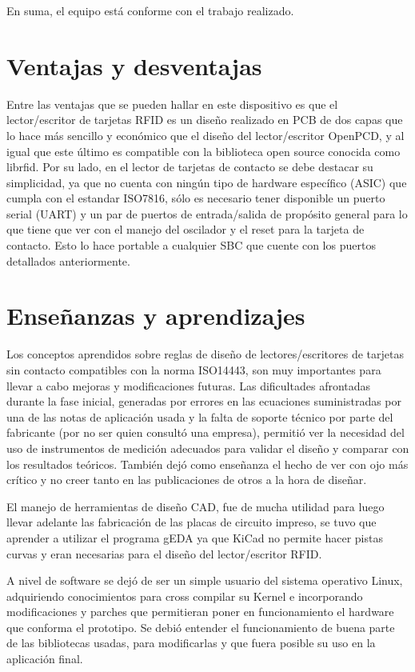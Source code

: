En suma, el equipo está conforme con el trabajo realizado.


\section{Ventajas y desventajas}


Entre las ventajas que se pueden hallar en este dispositivo es que el lector/escritor de tarjetas RFID es un diseño realizado en PCB de dos capas que lo hace más sencillo y económico que el diseño del lector/escritor OpenPCD, y al igual que este último es compatible con la biblioteca open source conocida como librfid.
Por su lado, en el lector de tarjetas de contacto se debe destacar su simplicidad, ya que no cuenta con ningún tipo de hardware específico (ASIC) que cumpla con el estandar ISO7816, sólo es necesario tener disponible un puerto serial (UART) y un par de puertos de entrada/salida de propósito general para lo que tiene que ver con el manejo del oscilador y el reset para la tarjeta de contacto. Esto lo hace portable a cualquier SBC que cuente con los puertos detallados anteriormente.


\section{Enseñanzas y aprendizajes}
Los conceptos aprendidos sobre reglas de diseño de lectores/escritores de 
tarjetas sin contacto compatibles con la norma ISO14443, son muy importantes
para llevar a cabo mejoras y modificaciones futuras. Las dificultades afrontadas
durante la fase inicial, generadas por errores en las ecuaciones suministradas
por una de las notas de aplicación usada y la falta de soporte técnico por
parte del fabricante (por no ser quien consultó una empresa), permitió ver la 
necesidad del uso de instrumentos de medición adecuados para validar el 
diseño y comparar con los resultados teóricos. También dejó como enseñanza el hecho de ver con ojo más crítico y no creer tanto en las publicaciones de otros a la hora de diseñar.


El manejo de herramientas de diseño CAD, fue de mucha utilidad para luego
llevar adelante las fabricación de las placas de circuito impreso, se tuvo que aprender a utilizar el programa gEDA ya que KiCad no permite hacer pistas curvas y eran necesarias para el diseño del lector/escritor RFID.

A nivel de software se dejó de ser un simple usuario del sistema operativo
Linux, adquiriendo conocimientos para cross compilar su Kernel e incorporando
modificaciones y parches que permitieran poner en funcionamiento el hardware
que conforma el prototipo. Se debió entender el funcionamiento de buena parte
de las bibliotecas usadas, para modificarlas y que fuera posible su uso en la 
aplicación final. 


